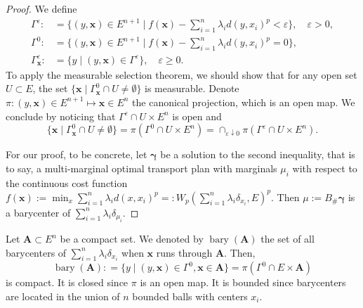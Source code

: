 \begin{proof}
	We define
	\begin{align*}
		\Gamma^\varepsilon:                   & =	\{
		(y,\boldsymbol{x}) \in E^{n+1} \mid  f(\boldsymbol{x}) - \sum_{i=1}^{n} \lambda_i d(y,x_i)^p < \varepsilon
		\}, \quad \varepsilon > 0,                                                                          \\
		\Gamma^0:                             & =	\{
		(y,\boldsymbol{x}) \in E^{n+1} \mid  f(\boldsymbol{x}) - \sum_{i=1}^{n} \lambda_i d(y,x_i)^p = 0
		\},                                                                                                 \\
		\Gamma^\varepsilon_{\boldsymbol{x}} : & = \{ y \mid (y, \boldsymbol{x} ) \in \Gamma^\varepsilon \},
		\quad \varepsilon \geq 0.
	\end{align*}
	To apply the measurable selection theorem,
	we should show that for any open set $U \subset E$, the set
	$\{ \boldsymbol{x} \mid \Gamma^0_{\boldsymbol{x}} \cap U \ne \emptyset \}$
	is measurable.
	Denote $\pi: (y , \boldsymbol{x}) \in E^{n+1} \mapsto  \boldsymbol{x} \in E^n$ the canonical projection,
	which is an open map.
	We conclude by noticing that $\Gamma^\varepsilon \cap U \times E^n$ is open and
	\[
		\{ \boldsymbol{x} \mid \Gamma^0_{\boldsymbol{x}} \cap U \ne \emptyset \}
		= \pi ( \Gamma^0  \cap U \times E^n)
		= \cap_{\varepsilon \downarrow 0}
		\pi ( \Gamma^\varepsilon \cap U \times E^n ).
	\]

	For our proof, to be concrete,
	let $\boldsymbol \gamma$ be a solution to the second inequality,
	that is to say,
	a multi-marginal optimal transport plan with marginals $\mu_i$ with respect to the continuous cost function
	$f(\boldsymbol{x}):=\min_{x} \sum_{i=1}^{n} \lambda_i d(x, x_i)^p = : W_p(\sum_{i=1}^n \lambda_i \delta_{x_i}, E)^p$.
	Then $\mu:= B_{\#}\boldsymbol \gamma$ is a barycenter of $\sum_{i=1}^{n}\lambda_i \delta_{\mu_i}$.
\end{proof}

\begin{rmk}
	\label{rmk:barycenter_compact}
	Let $\boldsymbol{A} \subset E^n$ be a compact set.
	We denoted by $\operatorname{bary}( \boldsymbol{A} )$
	the set of all barycenters of $\sum_{i=1}^n \lambda_i \delta_{x_i}$ when $\boldsymbol{x}$ runs through $\boldsymbol{A}$.
	Then,
	\[
		\operatorname{bary}( \boldsymbol{A} ) :
		=\{y \mid (y, \boldsymbol{x}) \in \Gamma^0, \boldsymbol{x} \in \boldsymbol{A} \}
		= \pi ( \Gamma^0  \cap E \times \boldsymbol{A})
	\]
	is compact.
	It is closed since $\pi$ is an open map.
	It is bounded since barycenters are located in the union of $n$ bounded balls with centers $x_i$.
\end{rmk}
